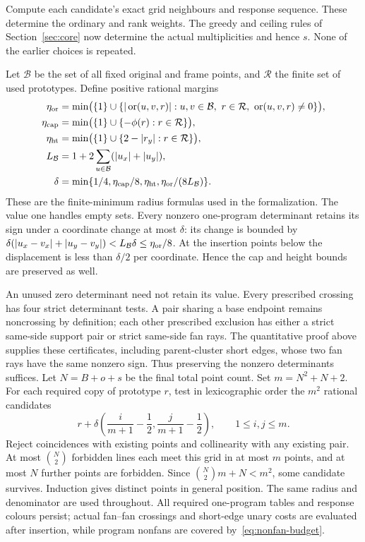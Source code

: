 Compute each candidate's exact grid neighbours and response sequence. These determine the ordinary and rank weights. The greedy and ceiling rules of Section~\ref{sec:core} now determine the actual multiplicities and hence $s$. None of the earlier choices is repeated.

Let $\mathcal B$ be the set of all fixed original and frame points, and $\mathcal R$ the finite set of used prototypes. Define positive rational margins
\begin{align*}
\eta_{\rm or}&=\min\bigl(\{1\}\cup
 \{|\orient(u,v,r)|:u,v\in\mathcal B,\ r\in\mathcal R,\ \orient(u,v,r)\ne0\}\bigr),\\
\eta_{\rm cap}&=\min\bigl(\{1\}\cup\{-\phi(r):r\in\mathcal R\}\bigr),\\
\eta_{\rm ht}&=\min\bigl(\{1\}\cup\{2-|r_y|:r\in\mathcal R\}\bigr),\\
L_{\mathcal B}&=1+2\sum_{u\in\mathcal B}(|u_x|+|u_y|),\\
\delta&=\min\{1/4,\eta_{\rm cap}/8,\eta_{\rm ht},\eta_{\rm or}/(8L_{\mathcal B})\}.
\end{align*}
These are the finite-minimum radius formulas used in the formalization. The value one handles empty sets. Every nonzero one-program determinant retains its sign under a coordinate change at most $\delta$: its change is bounded by $\delta(|u_x-v_x|+|u_y-v_y|)<L_{\mathcal B}\delta\leq\eta_{\rm or}/8$. At the insertion points below the displacement is less than $\delta/2$ per coordinate. Hence the cap and height bounds are preserved as well.

An unused zero determinant need not retain its value. Every prescribed crossing has four strict determinant tests. A pair sharing a base endpoint remains noncrossing by definition; each other prescribed exclusion has either a strict same-side support pair or strict same-side fan rays. The quantitative proof above supplies these certificates, including parent-cluster short edges, whose two fan rays have the same nonzero sign. Thus preserving the nonzero determinants suffices.
Let $N=B+o+s$ be the final total point count.
Set $m=N^2+N+2$. For each required copy of prototype $r$, test in lexicographic order the $m^2$ rational candidates
\begin{equation}\label{eq:fixed-grid}
r+\delta\left(\frac{i}{m+1}-\frac12,\frac{j}{m+1}-\frac12\right),\qquad 1\leq i,j\leq m.
\end{equation}
Reject coincidences with existing points and collinearity with any existing pair. At most $\binom N2$ forbidden lines each meet this grid in at most $m$ points, and at most $N$ further points are forbidden. Since $\binom{N}{2}m+N<m^2$, some candidate survives. Induction gives distinct points in general position. The same radius and denominator are used throughout. All required one-program tables and response colours persist; actual fan--fan crossings and short-edge unary costs are evaluated after insertion, while program nonfans are covered by~\eqref{eq:nonfan-budget}.


